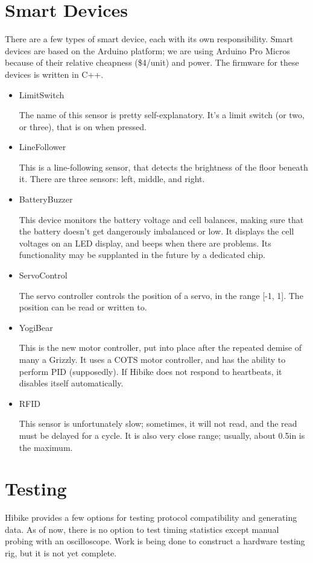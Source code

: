 \documentclass[12pt]{book}
\begin{document}
\section{Smart Devices}
There are a few types of smart device, each with its own responsibility.
Smart devices are based on the Arduino platform; we are using
Arduino Pro Micros because of their relative cheapness (\$4/unit)
and power. The firmware for these devices is written in C++.

\begin{itemize}
    \item LimitSwitch
        
        The name of this sensor is pretty self-explanatory. It's a limit
        switch (or two, or three), that is on when pressed.
    \item LineFollower

        This is a line-following sensor, that detects the brightness of
        the floor beneath it. There are three sensors: left, middle,
        and right.
    \item BatteryBuzzer

        This device monitors the battery voltage and cell balances,
        making sure that the battery doesn't get dangerously
        imbalanced or low. It displays the cell voltages
        on an LED display, and beeps when there are problems.
        Its functionality may be supplanted in
        the future by a dedicated chip.
    \item ServoControl

        The servo controller controls the position of a servo,
        in the range [-1, 1]. The position can be read or written to.

    \item YogiBear

        This is the new motor controller, put into place after the
        repeated demise of many a Grizzly. It uses a COTS motor controller,
        and has the ability to perform PID (supposedly). If Hibike
        does not respond to heartbeats, it disables itself automatically.

    \item RFID

        This sensor is unfortunately slow; sometimes, it will not read,
        and the read must be delayed for a cycle. It is also very close
        range; usually, about 0.5in is the maximum.
\end{itemize}


\section{Testing}
Hibike provides a few options for testing protocol compatibility
and generating data.
As of now, there is no option to test timing statistics except
manual probing with an oscilloscope. Work is being done to
construct a hardware testing rig, but it is not yet complete.
\end{document}
